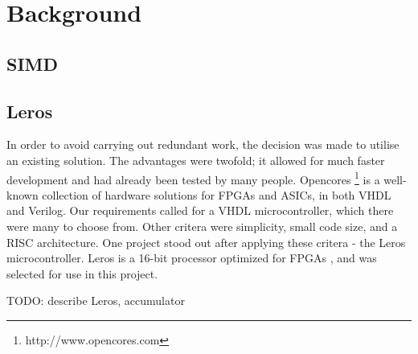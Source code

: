 \section{Background}
\subsection{SIMD}
\subsection{Leros}
In order to avoid carrying out redundant work, the decision was made to utilise
an existing solution. The advantages were twofold; it allowed for much faster
development and had already been tested by many people. Opencores \footnote{
http://www.opencores.com } is a well-known collection of hardware solutions for
FPGAs and ASICs, in both VHDL and Verilog. Our requirements called for a VHDL
microcontroller, which there were many to choose from. Other critera were
simplicity, small code size, and a RISC architecture. One project stood out
after applying these critera - the Leros microcontroller.  Leros is a 16-bit
processor optimized for FPGAs \cite{cite:TODO}, and was selected for use in this
project.
 
TODO: describe Leros, accumulator

